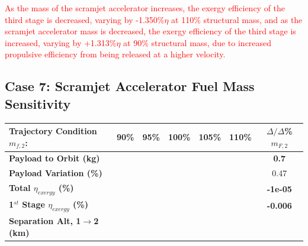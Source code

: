 \textcolor{red}{
As the mass of the scramjet accelerator increases, the exergy efficiency of the third stage is decreased, varying by -1.350\%$\eta$ at 110\% structural mass, and as the scramjet accelerator mass is decreased, the exergy efficiency of the third stage is increased, varying by +1.313\%$\eta$ at 90\% structural mass, due to increased propulsive efficiency from being released at a higher velocity. }


\subsection{Case 7: Scramjet Accelerator Fuel Mass Sensitivity} \label{sec:fuelmassNoReturn}

\begin{table}[!ht] %
\begin{tabular}{l c c c c c c} 
	\hline \textbf{Trajectory Condition}   \qquad  $m_{f,2}$:
	&90\%
	&95\%
	&100\%
	&105\%
	&110\%
	& $\Delta/\Delta$\%$m_{F,2}$
	\\
	\hline \textbf{Payload to Orbit (kg)}
	& \textbf{\PayloadToOrbitmFuelNinetyNoReturn}
	& \textbf{\PayloadToOrbitmFuelNinetyFiveNoReturn}
	& \textbf{\PayloadToOrbitmFuelStandardNoReturn}
	& \textbf{\PayloadToOrbitmFuelOneHundredFiveNoReturn}
	& \textbf{\PayloadToOrbitmFuelOneHundredTenNoReturn}
	&\textbf{0.7}
	\\
	\textbf{Payload Variation (\%)}
	& \PayloadVarmFuelNinetyNoReturn
	& \PayloadVarmFuelNinetyFiveNoReturn
	& \PayloadVarmFuelStandardNoReturn
	& \PayloadVarmFuelOneHundredFiveNoReturn
	& \PayloadVarmFuelOneHundredTenNoReturn
	&0.47
	\\
	\textbf{Total $\eta_{exergy}$ (\%)}
	& \textbf{\totalExergyEffmFuelNinetyNoReturn}
	& \textbf{\totalExergyEffmFuelNinetyFiveNoReturn}
	& \textbf{\totalExergyEffmFuelStandardNoReturn}
	& \textbf{\totalExergyEffmFuelOneHundredFiveNoReturn}
	& \textbf{\totalExergyEffmFuelOneHundredTenNoReturn}
	& \textbf{-1e-05}
	\\
	\hline 
	\textbf{1$^{st}$ Stage $\eta_{exergy}$ (\%)}
	& \textbf{\firstExergyEffmFuelNinetyNoReturn}
	& \textbf{\firstExergyEffmFuelNinetyFiveNoReturn}
	& \textbf{\firstExergyEffmFuelStandardNoReturn}
	& \textbf{\firstExergyEffmFuelOneHundredFiveNoReturn}
	& \textbf{\firstExergyEffmFuelOneHundredTenNoReturn}
	& \textbf{-0.006}
	\\
	\textbf{Separation Alt, 1$\rightarrow$2 (km)}
	& \firstsecondSeparationAltmFuelNinetyNoReturn
	& \firstsecondSeparationAltmFuelNinetyFiveNoReturn
	& \firstsecondSeparationAltmFuelStandardNoReturn

\end{tabular}
\end{table}
